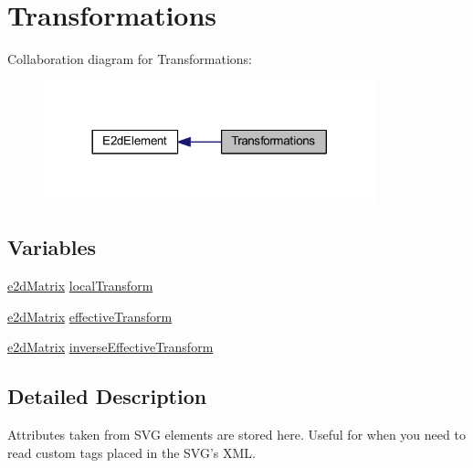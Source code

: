 \hypertarget{group__transformations}{\section{Transformations}
\label{group__transformations}
}
Collaboration diagram for Transformations\-:
\nopagebreak
\begin{figure}[H]
\begin{center}
\leavevmode
\includegraphics[width=272pt]{group__transformations}
\end{center}
\end{figure}
\subsection*{Variables}
\begin{DoxyCompactItemize}
\item 
\hyperlink{structe2d_matrix}{e2d\-Matrix} \hyperlink{group__transformations_ga52bda732df714953f93c1e6f5f7c7c93}{local\-Transform}
\item 
\hyperlink{structe2d_matrix}{e2d\-Matrix} \hyperlink{group__transformations_ga6c8e26945f09b5157e2111e42f99b879}{effective\-Transform}
\item 
\hyperlink{structe2d_matrix}{e2d\-Matrix} \hyperlink{group__transformations_ga5e6d7341f2dbef1923b0a3fcc13781c6}{inverse\-Effective\-Transform}
\end{DoxyCompactItemize}


\subsection{Detailed Description}
Attributes taken from S\-V\-G elements are stored here. Useful for when you need to read custom tags placed in the S\-V\-G's X\-M\-L. 

